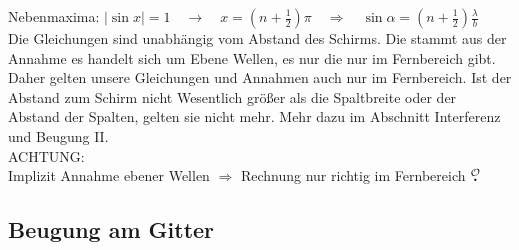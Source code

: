 \documentclass[titlepage,11pt,a4paper,ngerman]{report}
\newcommand{\lcom}[1]{\color{MidnightBlue}#1\color{black}}
\newcommand{\mau}{$\buildrel \mathcal{O} \over{\textbf{.}}$}
\begin{document}
Nebenmaxima: $ |\sin x| = 1 \quad \rightarrow \quad x = \left(n + \frac{1}{2}\right) \pi \quad \Rightarrow \quad  \sin \alpha = \left(n + \frac{1}{2}\right) \frac{\lambda}{b} $\\[5pt]
\lcom{Die Gleichungen sind unabhängig vom Abstand des Schirms. Die stammt aus der Annahme es handelt sich um Ebene Wellen, es nur die nur im Fernbereich gibt. Daher gelten unsere Gleichungen und Annahmen auch nur im Fernbereich. Ist der Abstand zum Schirm nicht Wesentlich größer als die Spaltbreite oder der Abstand der Spalten, gelten sie nicht mehr. Mehr dazu im Abschnitt Interferenz und Beugung II.}\\[5pt]
ACHTUNG:\\
Implizit Annahme ebener Wellen $ \Rightarrow $ Rechnung nur richtig im Fernbereich \mau

\subsection{Beugung am Gitter}
\end{document}
